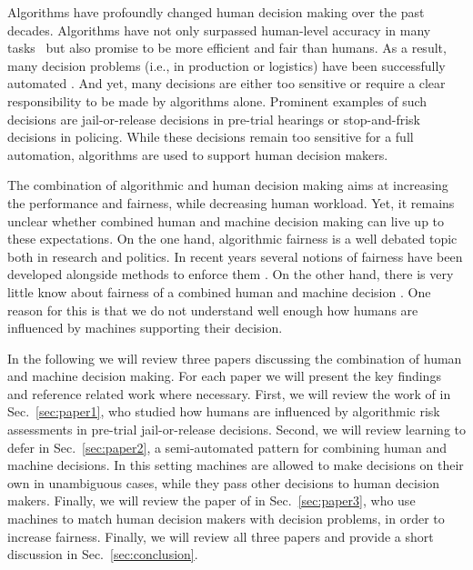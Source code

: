 \documentclass[11pt,a4paper,final]{article}
\begin{document}
Algorithms have profoundly changed human decision making over the past decades. Algorithms have not only surpassed human-level accuracy in many tasks~\cite[e.g.,][]{devlin2018bert} but also promise to be more efficient and fair than humans. As a result, many decision problems (i.e., in production or logistics) have been successfully automated \citep{manyika2017jobs}. And yet, many decisions are either too sensitive or require a clear responsibility to be made by algorithms alone. Prominent examples of such decisions are jail-or-release decisions in pre-trial hearings or stop-and-frisk decisions in policing. While these decisions remain too sensitive for a full automation, algorithms are used to support human decision makers. 

The combination of algorithmic and human decision making aims at increasing the performance and fairness, while decreasing human workload. Yet, it remains unclear whether combined human and machine decision making can live up to these expectations. On the one hand, algorithmic fairness is a well debated topic both in research and politics. In recent years several notions of fairness have been developed \citep[c.f.][]{corbett2018measure} alongside methods to enforce them \citep[e.g.][]{agarwal2018reductions}. On the other hand, there is very little know about fairness of a combined human and machine decision \citep{green2019disparate}. One reason for this is that we do not understand well enough how humans are influenced by machines supporting their decision. 

In the following we will review three papers discussing the combination of human and machine decision making. For each paper we will present the key findings and reference related work where necessary. 
First, we will review the work of \citet{green2019disparate} in Sec.~\ref{sec:paper1}, who studied how humans are influenced by algorithmic risk assessments in pre-trial jail-or-release decisions. Second, we will review learning to defer \citep{madras2018predict} in Sec.~\ref{sec:paper2}, a semi-automated pattern for combining human and machine decisions. In this setting machines are allowed to make decisions on their own in unambiguous cases, while they pass other decisions to human decision makers. Finally, we will review the paper of \citet{2018arXiv180510318V} in Sec.~\ref{sec:paper3}, who use machines to match human decision makers with decision problems, in order to increase fairness. Finally, we will review all three papers and provide a short discussion in Sec.~\ref{sec:conclusion}. 
\end{document}
